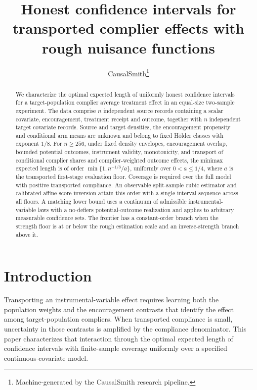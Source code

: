 \documentclass[11pt]{article}
\title{Honest confidence intervals for transported complier effects with rough nuisance functions}
\author{CausalSmith\thanks{Machine-generated by the CausalSmith research pipeline.}}
\date{\cspaperdate}
\begin{document}
\maketitle

\begin{abstract}
We characterize the optimal expected length of uniformly honest confidence intervals for a target-population complier average treatment effect in an equal-size two-sample experiment. The data comprise \(n\) independent source records containing a scalar covariate, encouragement, treatment receipt and outcome, together with \(n\) independent target covariate records. Source and target densities, the encouragement propensity and conditional arm means are unknown and belong to fixed Hölder classes with exponent \(1/8\). For \(n\ge256\), under fixed density envelopes, encouragement overlap, bounded potential outcomes, instrument validity, monotonicity, and transport of conditional complier shares and complier-weighted outcome effects, the minimax expected length is of order \(\min\{1,n^{-1/3}/a\}\), uniformly over \(0<a\le1/4\), where \(a\) is the transported first-stage evaluation floor. Coverage is required over the full model with positive transported compliance. An observable split-sample cubic estimator and calibrated affine-score inversion attain this order with a single interval sequence across all floors. A matching lower bound uses a continuum of admissible instrumental-variable laws with a no-defiers potential-outcome realization and applies to arbitrary measurable confidence sets. The frontier has a constant-order branch when the strength floor is at or below the rough estimation scale and an inverse-strength branch above it.
\end{abstract}

\section{Introduction}
\label{sec:introduction}

Transporting an instrumental-variable effect requires learning both the population weights and the encouragement contrasts that identify the effect among target-population compliers. When transported compliance is small, uncertainty in those contrasts is amplified by the compliance denominator. This paper characterizes that interaction through the optimal expected length of confidence intervals with finite-sample coverage uniformly over a specified continuous-covariate model.
\end{document}
